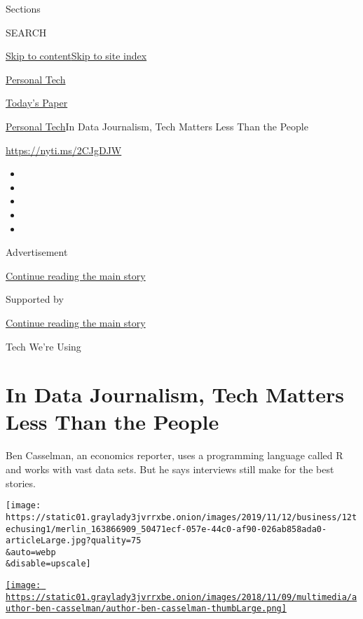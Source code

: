 Sections

SEARCH

\protect\hyperlink{site-content}{Skip to
content}\protect\hyperlink{site-index}{Skip to site index}

\href{https://www.nytimes3xbfgragh.onion/section/technology/personaltech}{Personal
Tech}

\href{https://myaccount.nytimes3xbfgragh.onion/auth/login?response_type=cookie\&client_id=vi}{}

\href{https://www.nytimes3xbfgragh.onion/section/todayspaper}{Today's
Paper}

\href{/section/technology/personaltech}{Personal Tech}\textbar{}In Data
Journalism, Tech Matters Less Than the People

\href{https://nyti.ms/2CJgDJW}{https://nyti.ms/2CJgDJW}

\begin{itemize}
\item
\item
\item
\item
\item
\end{itemize}

Advertisement

\protect\hyperlink{after-top}{Continue reading the main story}

Supported by

\protect\hyperlink{after-sponsor}{Continue reading the main story}

Tech We're Using

\hypertarget{in-data-journalism-tech-matters-less-than-the-people}{%
\section{In Data Journalism, Tech Matters Less Than the
People}\label{in-data-journalism-tech-matters-less-than-the-people}}

Ben Casselman, an economics reporter, uses a programming language called
R and works with vast data sets. But he says interviews still make for
the best stories.

\texttt{[image: https://static01.graylady3jvrrxbe.onion/images/2019/11/12/business/12techusing1/merlin\_163866909\_50471ecf-057e-44c0-af90-026ab858ada0-articleLarge.jpg?quality=75\\\&auto=webp\\\&disable=upscale]}

\href{https://www.nytimes3xbfgragh.onion/by/ben-casselman}{\texttt{[image: https://static01.graylady3jvrrxbe.onion/images/2018/11/09/multimedia/author-ben-casselman/author-ben-casselman-thumbLarge.png]}}

